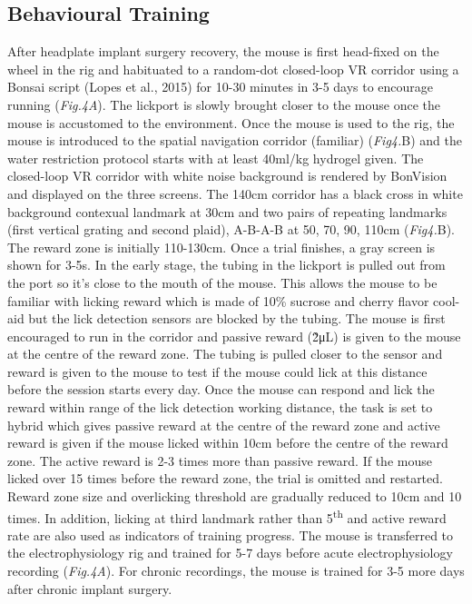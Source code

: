 \subsection{Behavioural Training}
After headplate implant surgery recovery, the mouse is first head-fixed on the wheel in the rig and habituated to a random-dot closed-loop VR corridor using a Bonsai script (Lopes et al., 2015) for 10-30 minutes in 3-5 days to encourage running (\textit{Fig.4A}). The lickport is slowly brought closer to the mouse once the mouse is accustomed to the environment. Once the mouse is used to the rig, the mouse is introduced to the spatial navigation corridor (familiar) (\textit{Fig4.}B) and the water restriction protocol starts with at least 40ml/kg hydrogel given. The closed-loop VR corridor with white noise background is rendered by BonVision and displayed on the three screens. The 140cm corridor has a black cross in white background contexual landmark at 30cm and two pairs of repeating landmarks (first vertical grating and second plaid), A-B-A-B at 50, 70, 90, 110cm (\textit{Fig4.}B). The reward zone is initially 110-130cm. Once a trial finishes, a gray screen is shown for 3-5s. In the early stage, the tubing in the lickport is pulled out from the port so it’s close to the mouth of the mouse. This allows the mouse to be familiar with licking reward which is made of 10\% sucrose and cherry flavor cool-aid but the lick detection sensors are blocked by the tubing. The mouse is first encouraged to run in the corridor and passive reward (\~2μL) is given to the mouse at the centre of the reward zone. The tubing is pulled closer to the sensor and reward is given to the mouse to test if the mouse could lick at this distance before the session starts every day. Once the mouse can respond and lick the reward within range of the lick detection working distance, the task is set to hybrid which gives passive reward at the centre of the reward zone and active reward is given if the mouse licked within 10cm before the centre of the reward zone. The active reward is 2-3 times more than passive reward. If the mouse licked over 15 times before the reward zone, the trial is omitted and restarted. Reward zone size and overlicking threshold are gradually reduced to 10cm and 10 times. In addition, licking at third landmark rather than 5\textsuperscript{th} and active reward rate are also used as indicators of training progress. The mouse is transferred to the electrophysiology rig and trained for 5-7 days before acute electrophysiology recording (\textit{Fig.4A}). For chronic recordings, the mouse is trained for 3-5 more days after chronic implant surgery.


